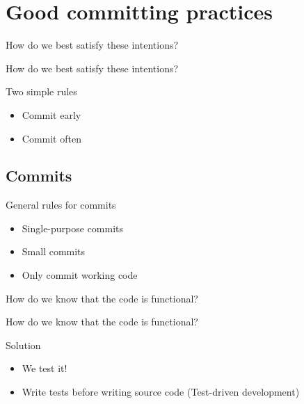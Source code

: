 \section{Good committing practices}
\begin{frame}
\begin{question}
    How do we best satisfy these intentions?
\end{question}
\end{frame}



\begin{frame}
\begin{question}
    How do we best satisfy these intentions?
\end{question}
\begin{block}{Two simple rules}
    \begin{itemize}
        \item Commit early
        \item Commit often
    \end{itemize}
\end{block}
\end{frame}


\subsection{Commits}
\begin{frame}
\begin{block}{General rules for commits}
   \begin{itemize}
       \item Single-purpose commits
       \pause
       \item Small commits
       \pause
       \item Only commit working code
   \end{itemize}
\end{block}
\pause
\begin{question}
    How do we know that the code is functional?
\end{question}
\end{frame}

\begin{frame}
\begin{question}
    How do we know that the code is functional?
\end{question}
\pause
\begin{block}{Solution}
\begin{itemize}
    \item We test it!
    \item Write tests before writing source code (Test-driven development)
\end{itemize}
\end{block}
\end{frame}

